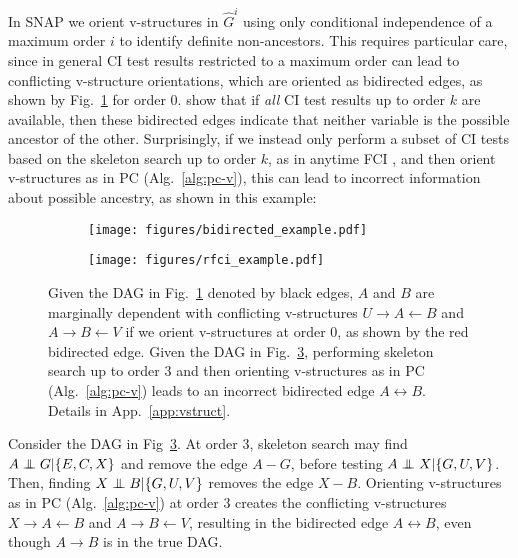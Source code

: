 In \ac{SNAP} we orient v-structures in $\hat{G}^i$ using only conditional independence of a maximum order $i$ to identify definite non-ancestors.
This requires particular care, since in general \ac{CI} test results restricted to a maximum order can lead to conflicting v-structure orientations, which are oriented as bidirected edges, as shown by Fig.~\ref{fig:bidirected_example_main} for order $0$.
\citet{wienobst2020recovering} show that if \emph{all} \ac{CI} test results up to order $k$ are available, then these bidirected edges indicate that neither variable is the possible ancestor of the other.
Surprisingly, if we instead only perform a subset of \ac{CI} tests based on the skeleton search up to order $k$, as in anytime FCI \citep{pmlr-vR3-spirtes01a}, and then orient v-structures as in PC (Alg.~\ref{alg:pc-v}), this can lead to incorrect information about possible ancestry, as shown in this example:

\begin{figure}[t]
    \centering
    \begin{subfigure}{.25\linewidth}
        \centering
        \texttt{[image: figures/bidirected\_example.pdf]}
        \caption{}
        \label{fig:bidirected_example_main}
    \end{subfigure}
    \hspace{.1\linewidth}
    \begin{subfigure}{.45\linewidth}
        \centering
        \texttt{[image: figures/rfci\_example.pdf]}
        \caption{}
        \label{fig:rfci_example}
    \end{subfigure}
    \caption{Given the DAG in Fig.~\ref{fig:bidirected_example_main} denoted by black edges, $A$ and $B$ are marginally dependent with conflicting v-structures $U \to A \gets B$ and $A \to B \gets V$ if we orient v-structures at order 0, as shown by the red bidirected edge.
    Given the DAG in Fig.~\ref{fig:rfci_example}, performing skeleton search up to order 3 and then orienting v-structures as in PC (Alg.~\ref{alg:pc-v}) leads to an incorrect bidirected edge $A \leftrightarrow B $.
    Details in App.~\ref{app:vstruct}.}
\end{figure}

\begin{example}
\label{example:rfci}
Consider the DAG in Fig~\ref{fig:rfci_example}.
At order 3, skeleton search may find $A \perp\kern-6pt\perp G | \{E,C,X\}$ and remove the edge $A-G$, before testing $A \perp\kern-6pt\perp X | \{G,U,V\}$.
Then, finding $X \perp\kern-6pt\perp B | \{G,U,V\}$ removes the edge $X - B$.
Orienting v-structures as in PC (Alg.~\ref{alg:pc-v}) at order 3 creates the conflicting v-structures $X \to A \gets B$ and $A \to B \gets V$, resulting in the bidirected edge $A \leftrightarrow B$, even though $A \to B$ is in the true DAG.
\end{example}

